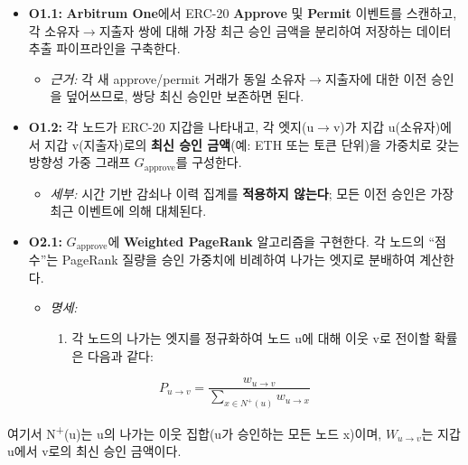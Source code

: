 \begin{itemize}
\item[\textbullet] \textbf{O1.1: }\textbf{Arbitrum One}에서 ERC-20 \textbf{Approve} 및 \textbf{Permit} 이벤트를 스캔하고, 각 소유자\(\to\)지출자 쌍에 대해 가장 최근 승인 금액을 분리하여 저장하는 데이터 추출 파이프라인을 구축한다.
\begin{itemize}
\item[\textendash] \emph{근거: }각 새 approve/permit 거래가 동일 소유자\(\to\)지출자에 대한 이전 승인을 덮어쓰므로, 쌍당 최신 승인만 보존하면 된다.
\end{itemize}
\item[\textbullet] \textbf{O1.2: }각 노드가 ERC-20 지갑을 나타내고, 각 엣지(u\(\to\)v)가 지갑 u(소유자)에서 지갑 v(지출자)로의 \textbf{최신 승인 금액}(예: ETH 또는 토큰 단위)을 가중치로 갖는 방향성 가중 그래프 $G_{\text{approve}}$를 구성한다.
\begin{itemize}
\item[\textendash] \emph{세부: }시간 기반 감쇠나 이력 집계를 \textbf{적용하지 않는다}; 모든 이전 승인은 가장 최근 이벤트에 의해 대체된다.
\end{itemize}
\end{itemize}

\begin{itemize}
\item[\textbullet] \textbf{O2.1: }$G_{\text{approve}}$에 \textbf{Weighted PageRank} 알고리즘을 구현한다. 각 노드의 ``점수''는 PageRank 질량을 승인 가중치에 비례하여 나가는 엣지로 분배하여 계산한다.
\begin{itemize}
\item[\textendash] \emph{명세:}
\begin{enumerate}
\item[(a)] 각 노드의 나가는 엣지를 정규화하여 노드 u에 대해 이웃 v로 전이할 확률은 다음과 같다:
\end{enumerate}
\end{itemize}
\end{itemize}
\[P_{u\to v} = \frac{w_{u\to v}}{\sum _{x\in N^{+}(u)}w_{u\to x}}\]

여기서 N\textsuperscript{+}(u)는 u의 나가는 이웃 집합(u가 승인하는 모든 노드 x)이며, $W_{u\to v}$는 지갑 u에서 v로의 최신 승인 금액이다.


